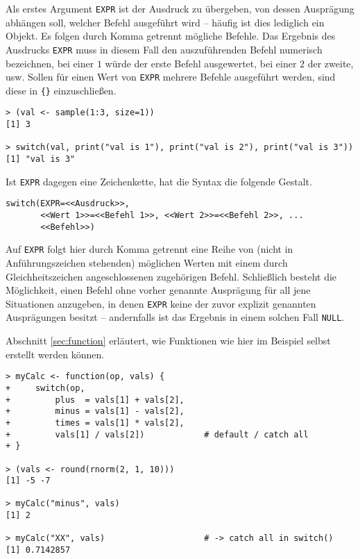Als erstes Argument \lstinline!EXPR! ist der Ausdruck zu übergeben, von dessen Ausprägung abhängen soll, welcher Befehl ausgeführt wird -- häufig ist dies lediglich ein Objekt. Es folgen durch Komma getrennt mögliche Befehle. Das Ergebnis des Ausdrucks \lstinline!EXPR! muss in diesem Fall den auszuführenden Befehl numerisch bezeichnen, bei einer $1$ würde der erste Befehl ausgewertet, bei einer $2$ der zweite, usw. Sollen für einen Wert von \lstinline!EXPR! mehrere Befehle ausgeführt werden, sind diese in \lstinline!{}! einzuschließen.
\begin{lstlisting}
> (val <- sample(1:3, size=1))
[1] 3

> switch(val, print("val is 1"), print("val is 2"), print("val is 3"))
[1] "val is 3"
\end{lstlisting}

Ist \lstinline!EXPR! dagegen eine Zeichenkette, hat die Syntax die folgende Gestalt.
\begin{lstlisting}
switch(EXPR=<<Ausdruck>>,
       <<Wert 1>>=<<Befehl 1>>, <<Wert 2>>=<<Befehl 2>>, ...
       <<Befehl>>)
\end{lstlisting}

Auf \lstinline!EXPR! folgt hier durch Komma getrennt eine Reihe von (nicht in Anführungszeichen stehenden) möglichen Werten mit einem durch Gleichheitszeichen angeschlossenen zugehörigen Befehl. Schließlich besteht die Möglichkeit, einen Befehl ohne vorher genannte Ausprägung für all jene Situationen anzugeben, in denen \lstinline!EXPR! keine der zuvor explizit genannten Ausprägungen besitzt -- andernfalls ist das Ergebnis in einem solchen Fall \lstinline!NULL!\@.

Abschnitt \ref{sec:function} erläutert, wie Funktionen wie hier im Beispiel selbst erstellt werden können.
\begin{lstlisting}
> myCalc <- function(op, vals) {
+     switch(op,
+         plus  = vals[1] + vals[2],
+         minus = vals[1] - vals[2],
+         times = vals[1] * vals[2],
+         vals[1] / vals[2])            # default / catch all
+ }

> (vals <- round(rnorm(2, 1, 10)))
[1] -5 -7

> myCalc("minus", vals)
[1] 2

> myCalc("XX", vals)                    # -> catch all in switch() 
[1] 0.7142857
\end{lstlisting}

